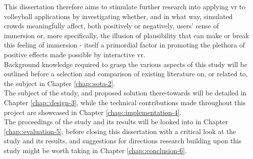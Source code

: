 This dissertation therefore aims to stimulate further research into applying \gls{vr} to volleyball applications by investigating whether, and in what way, simulated crowds meaningfully affect, both positively or negatively, users' sense of immersion or, more specifically, the illusion of plausibility that can make or break this feeling of immersion - itself a primordial factor in promoting the plethora of positive effects made possible by interactive \gls{vr}.\\

\noindent Background knowledge required to grasp the various aspects of this study will be outlined before a selection and comparison of existing literature on, or related to, the subject in Chapter \ref{chap::sota-2}.\\
The subject of the study, and proposed solution there-towards will be detailed in Chapter \ref{chap::design-3}, while the technical contributions made throughout this project are showcased in Chapter \ref{chap::implementation-4}.\\
The proceedings of the study and its results will be looked into in Chapter \ref{chap::evaluation-5}, before closing this dissertation with a critical look at the study and its results, and suggestions for directions research building upon this study might be worth taking in Chapter \ref{chap::conclusion-6}.
